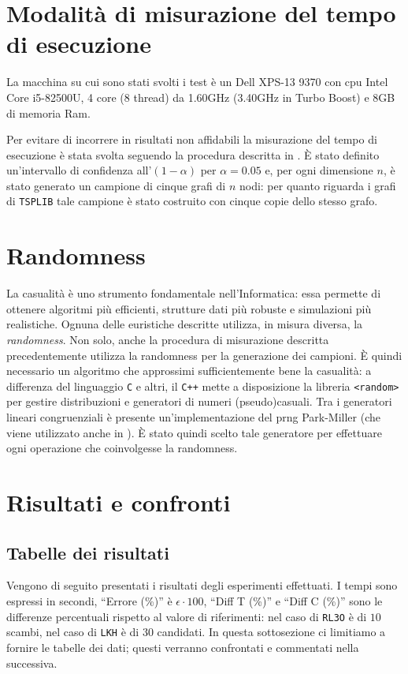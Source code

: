 \section{Modalità di misurazione del tempo di esecuzione}

La macchina su cui sono stati svolti i test è un Dell XPS-13 9370 con cpu Intel Core i5-82500U, 4 core (8 thread) da 
1.60GHz (3.40GHz in Turbo Boost) e 8GB di memoria Ram.

Per evitare di incorrere in risultati non affidabili la misurazione del tempo di esecuzione è stata svolta 
seguendo la procedura descritta in \cite{Poli}. È stato definito un'intervallo di confidenza all'$(1-\alpha)$ 
per $\alpha=0.05$ e, per ogni dimensione $n$, è stato generato un campione di cinque grafi di $n$ nodi: per quanto 
riguarda i grafi di \texttt{TSPLIB} tale campione è stato costruito con cinque copie dello stesso grafo.

\section{Randomness}

La casualità è uno strumento fondamentale nell'Informatica: essa permette di ottenere algoritmi più efficienti, 
strutture dati più robuste e simulazioni più realistiche. Ognuna delle euristiche descritte utilizza, in misura 
diversa, la \textit{randomness}. Non solo, anche la procedura di misurazione descritta precedentemente utilizza 
la randomness per la generazione dei campioni. È quindi necessario un algoritmo che approssimi 
sufficientemente bene la casualità: a differenza del linguaggio \texttt{C} e altri, il \texttt{C++} mette a 
disposizione la libreria \texttt{<random>} per gestire distribuzioni e generatori di numeri (pseudo)casuali. 
Tra i generatori lineari congruenziali è presente un'implementazione del prng Park-Miller (che viene 
utilizzato anche in \cite{Poli}). È stato quindi scelto tale generatore per effettuare ogni operazione che 
coinvolgesse la randomness.

\section{Risultati e confronti}

\subsection{Tabelle dei risultati}

Vengono di seguito presentati i risultati degli esperimenti effettuati. I tempi sono espressi in 
secondi, ``Errore (\%)'' è $\epsilon\cdot{}100$, ``Diff T (\%)'' e ``Diff C (\%)'' sono le differenze 
percentuali rispetto al valore di riferimenti: nel caso di \texttt{RL3O} è di $10$ scambi, nel caso di 
\texttt{LKH} è di $30$ candidati. In questa sottosezione ci limitiamo a fornire le tabelle dei dati; 
questi verranno confrontati e commentati nella successiva.
\ \\
\ \\
\ \\

